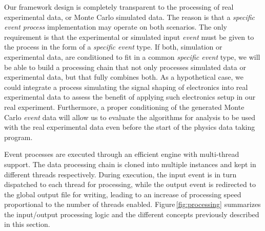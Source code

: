 Our framework design is completely transparent to the processing of real experimental data, or Monte Carlo simulated data. The reason is that a \emph{specific event process} implementation may operate on both scenarios. The only requirement is that the experimental or simulated input \emph{event} must be given to the process in the form of a \emph{specific event} type. If both, simulation or experimental data, are conditioned to fit in a common \emph{specific event} type, we will be able to build a processing chain that not only processes simulated data or experimental data, but that fully combines both. As a hypothetical case, we could integrate a process simulating the signal shaping of electronics into real experimental data to assess the benefit of applying such electronics setup in our real experiment. Furthermore, a proper conditioning of the generated Monte Carlo \emph{event} data will allow us to evaluate the algorithms for analysis to be used with the real experimental data even before the start of the physics data taking program.





Event processes are executed through an efficient engine with multi-thread support. The data processing chain is cloned into multiple instances and kept in different threads respectively. During execution, the input event is in turn dispatched to each thread for processing, while the output event is redirected to the global output file for writing, leading to an increase of processing speed proportional to the number of threads enabled. Figure\,\ref{fig:processing} summarizes the input/output processing logic and the different concepts previously described in this section.   %

